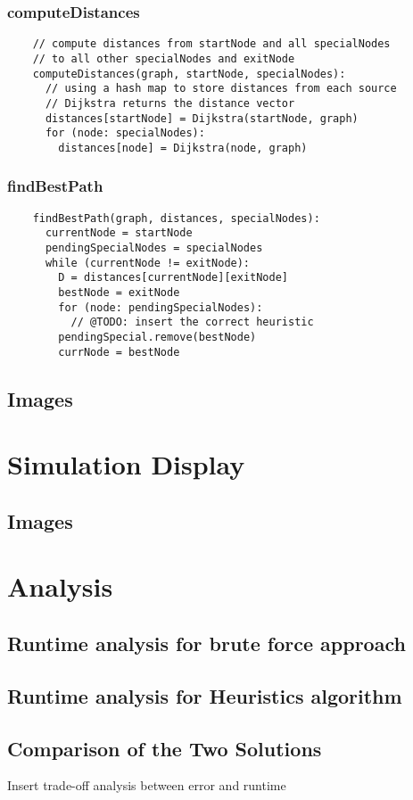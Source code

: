 \documentclass[12pt]{report}
\begin{document}
\subsection{computeDistances}
\begin{tcolorbox}
\begin{verbatim}
    // compute distances from startNode and all specialNodes
    // to all other specialNodes and exitNode
    computeDistances(graph, startNode, specialNodes):
      // using a hash map to store distances from each source
      // Dijkstra returns the distance vector
      distances[startNode] = Dijkstra(startNode, graph)
      for (node: specialNodes):
        distances[node] = Dijkstra(node, graph)
\end{verbatim}
\end{tcolorbox}

\subsection{findBestPath}
\begin{tcolorbox}
\begin{verbatim}
    findBestPath(graph, distances, specialNodes):
      currentNode = startNode
      pendingSpecialNodes = specialNodes
      while (currentNode != exitNode):
        D = distances[currentNode][exitNode]
        bestNode = exitNode
        for (node: pendingSpecialNodes):
          // @TODO: insert the correct heuristic
        pendingSpecial.remove(bestNode)
        currNode = bestNode
\end{verbatim}
\end{tcolorbox}
\section{Images}

\chapter{Simulation Display}
\section{Images}


\chapter{Analysis}

\section{Runtime analysis for brute force approach}

\section{Runtime analysis for Heuristics algorithm}

\section{Comparison of the Two Solutions}
Insert trade-off analysis between error and runtime
\end{document}
